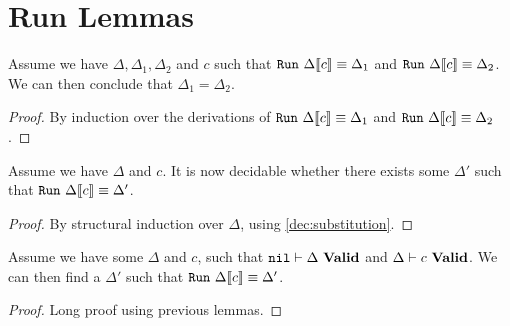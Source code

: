 \section{Run Lemmas}

\begin{lemma}
  Assume we have $\Delta, \Delta_1, \Delta_2$ and $c$ such that
  $\mathtt{Run}\ {\Delta} \llbracket {c} \rrbracket \equiv {\Delta_1}$ and $\mathtt{Run}\ {\Delta} \llbracket {c} \rrbracket \equiv {\Delta_2}$. We can then
  conclude that $\Delta_1 = \Delta_2$.
\end{lemma}

\begin{proof}
  By induction over the derivations of $\mathtt{Run}\ {\Delta} \llbracket {c} \rrbracket \equiv {\Delta_1}$ and
  $\mathtt{Run}\ {\Delta} \llbracket {c} \rrbracket \equiv {\Delta_2}$.
\end{proof}

\begin{lemma}
  Assume we have $\Delta$ and $c$. It is now decidable whether there exists some
  $\Delta'$ such that $\mathtt{Run}\ {\Delta} \llbracket {c} \rrbracket \equiv {\Delta'}$.
\end{lemma}

\begin{proof}
  By structural induction over $\Delta$, using \autoref{dec:substitution}.
\end{proof}

\begin{lemma}
  Assume we have some $\Delta$ and $c$, such that ${\mathtt{nil}} |- {\Delta}\ \mathbf{Valid}$
  and ${\Delta} |- {c}\ \mathbf{Valid}$. We can then find a $\Delta'$ such that
  $\mathtt{Run}\ {\Delta} \llbracket {c} \rrbracket \equiv {\Delta'}$.
\end{lemma}

\begin{proof}
  Long proof using previous lemmas.
\end{proof}
